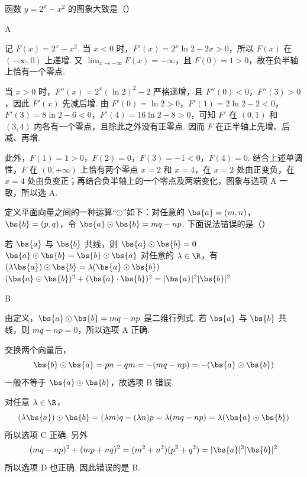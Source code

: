 \begin{problem}
函数 \(y = 2^x - x^{2}\) 的图象大致是（\quad）

    {}
    {}
    {}
\end{problem}

\begin{answer}
A
\end{answer}

\begin{solution}
记 \(F(x)=2^x-x^2\). 当 \(x<0\) 时，\(F'(x)=2^x\ln2-2x>0\)，所以 \(F(x)\) 在 \((-\infty,0)\) 上递增. 又 \(\displaystyle\lim_{x\to-\infty}F(x)=-\infty\)，且 \(F(0)=1>0\)，故在负半轴上恰有一个零点.

当 \(x>0\) 时，\(F''(x)=2^x(\ln2)^2-2\) 严格递增，且 \(F''(0)<0\)，\(F''(3)>0\)，因此 \(F'(x)\) 先减后增. 由 \(F'(0)=\ln2>0\)，\(F'(1)=2\ln2-2<0\)，\(F'(3)=8\ln2-6<0\)，\(F'(4)=16\ln2-8>0\)，可知 \(F'\) 在 \((0,1)\) 和 \((3,4)\) 内各有一个零点，且除此之外没有正零点. 因而 \(F\) 在正半轴上先增、后减、再增.

此外，\(F(1)=1>0\)，\(F(2)=0\)，\(F(3)=-1<0\)，\(F(4)=0\). 结合上述单调性，\(F\) 在 \((0,+\infty)\) 上恰有两个零点 \(x=2\) 和 \(x=4\)，在 \(x=2\) 处由正变负，在 \(x=4\) 处由负变正；再结合负半轴上的一个零点及两端变化，图象与选项 A 一致，所以选 A.
\end{solution}

\begin{problem}
定义平面向量之间的一种运算“\(\odot\)”如下：对任意的 \(\bs{a} = (m, n)\)，\(\bs{b} = (p, q)\)，令 \(\bs{a} \odot \bs{b} = mq - np\). 下面说法错误的是（\quad）

\choices
    {若 \(\bs{a}\) 与 \(\bs{b}\) 共线，则 \(\bs{a} \odot \bs{b} = 0\)}
    {\(\bs{a} \odot \bs{b} = \bs{b} \odot \bs{a}\)}
    {对任意的 \(\lambda \in \R\)，有 \((\lambda \bs{a}) \odot \bs{b} = \lambda (\bs{a} \odot \bs{b})\)}
    {\((\bs{a}\odot \bs{b})^2 +(\bs{a}\cdot \bs{b})^2 = |\bs{a}|^2 |\bs{b}|^2\)}
\end{problem}

\begin{answer}
B
\end{answer}

\begin{solution}
由定义，\(\bs{a}\odot\bs{b}=mq-np\) 是二维行列式. 若 \(\bs{a}\) 与 \(\bs{b}\) 共线，则 \(mq-np=0\)，所以选项 A 正确.

交换两个向量后，
\[
\bs{b}\odot\bs{a}=pn-qm=-(mq-np)=-(\bs{a}\odot\bs{b})
\]
一般不等于 \(\bs{a}\odot\bs{b}\)，故选项 B 错误.

对任意 \(\lambda\in\R\)，
\[
(\lambda\bs{a})\odot\bs{b}=(\lambda m)q-(\lambda n)p=\lambda(mq-np)=\lambda(\bs{a}\odot\bs{b})
\]
所以选项 C 正确. 另外
\[
(mq-np)^2+(mp+nq)^2=(m^2+n^2)(p^2+q^2)=|\bs{a}|^2|\bs{b}|^2
\]
所以选项 D 也正确. 因此错误的是 B.
\end{solution}

